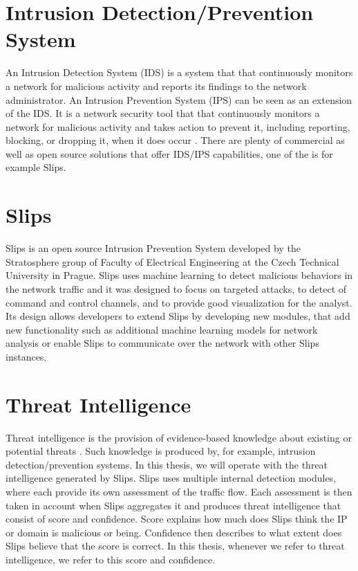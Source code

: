 
\section{Intrusion Detection/Prevention System}
\label{sec:intrusion-detection-prevention-system}
An Intrusion Detection System (IDS) is a system that that continuously monitors a network for malicious activity and reports its findings to the network administrator.
An Intrusion Prevention System (IPS) can be seen as an extension of the IDS. 
It is a network security tool that that continuously monitors a network for malicious activity and takes action to prevent it, including reporting, blocking, or dropping it, when it does occur \cite{vmware}.
There are plenty of commercial as well as open source solutions that offer IDS/IPS capabilities, one of the is for example Slips.

\section{Slips}
\label{sec:slips}
Slips is an open source Intrusion Prevention System developed by the Stratosphere group of Faculty of Electrical Engineering at the Czech Technical University in Prague.
Slips uses machine learning to detect malicious behaviors in the network traffic and it was designed to focus on targeted attacks, to detect of command and control channels, and to provide good visualization for the analyst.\cite{slips}
Its design allows developers to extend Slips by developing new modules, that add new functionality such as additional machine learning models for network analysis or enable Slips to communicate over the network with other Slips instances.

\section{Threat Intelligence}
\label{sec:threat-intelligence}
Threat intelligence is the provision of evidence-based knowledge about existing or potential threats \cite{threatintelligence}.
Such knowledge is produced by, for example, intrusion detection/prevention systems. 
In this thesis, we will operate with the threat intelligence generated by Slips.
Slips uses multiple internal detection modules, where each provide its own assessment of the traffic flow. 
Each assessment is then taken in account when Slips aggregates it and produces threat intelligence that consist of score and confidence.
Score explains how much does Slips think the IP or domain is malicious or being.
Confidence then describes to what extent does Slips believe that the score is correct.
In this thesis, whenever we refer to threat intelligence, we refer to this score and confidence.


